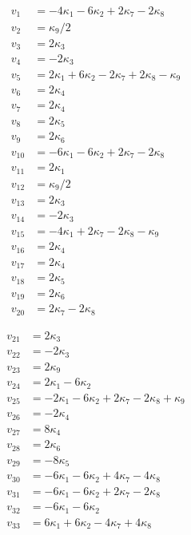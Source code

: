 \documentclass[11pt]{article}
\begin{document}
\begin{align}
	v_{1} &= -4\kappa_1 - 6\kappa_2 + 2\kappa_7 - 2\kappa_8\\
v_{2} &= \kappa_9/2\\
v_{3} &= 2\kappa_3\\
v_{4} &= -2\kappa_3\\
v_{5} &= 2\kappa_1 + 6\kappa_2 - 2\kappa_7 + 2\kappa_8 - \kappa_9\\
v_{6} &= 2\kappa_4\\
v_{7} &= 2\kappa_4\\
v_{8} &= 2\kappa_5\\
v_{9} &= 2\kappa_6\\
v_{10} &= -6\kappa_1 - 6\kappa_2 + 2\kappa_7 - 2\kappa_8\\
v_{11} &= 2\kappa_1\\
v_{12} &= \kappa_9/2\\
v_{13} &= 2\kappa_3\\
v_{14} &= -2\kappa_3\\
v_{15} &= -4\kappa_1 + 2\kappa_7 - 2\kappa_8 - \kappa_9\\
v_{16} &= 2\kappa_4\\
v_{17} &= 2\kappa_4\\
v_{18} &= 2\kappa_5\\
v_{19} &= 2\kappa_6\\
v_{20} &= 2\kappa_7 - 2\kappa_8
\end{align}

\begin{align}
v_{21} &= 2\kappa_3\\
v_{22} &= -2\kappa_3\\
v_{23} &= 2\kappa_9\\
v_{24} &= 2\kappa_1 - 6\kappa_2\\
v_{25} &= -2\kappa_1 - 6\kappa_2 + 2\kappa_7 - 2\kappa_8 + \kappa_9\\
v_{26} &= -2\kappa_4\\
v_{27} &= 8\kappa_4\\
v_{28} &= 2\kappa_6\\
v_{29} &= -8\kappa_5\\
v_{30} &= -6\kappa_1 - 6\kappa_2 + 4\kappa_7 - 4\kappa_8\\
v_{31} &= -6\kappa_1 - 6\kappa_2 + 2\kappa_7 - 2\kappa_8\\
v_{32} &= -6\kappa_1 - 6\kappa_2\\
v_{33} &= 6\kappa_1 + 6\kappa_2 - 4\kappa_7 + 4\kappa_8
\end{align}
\end{document}
